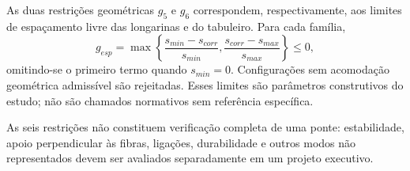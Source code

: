 As duas restrições geométricas $g_5$ e $g_6$ correspondem, respectivamente, aos limites de espaçamento livre das longarinas e do tabuleiro. Para cada família,
\begin{equation}
 g_{esp}=\max\left\{\frac{s_{min}-s_{corr}}{s_{min}},
                         \frac{s_{corr}-s_{max}}{s_{max}}\right\}\leq0,
\label{eq:restricao_espaco}
\end{equation}
omitindo-se o primeiro termo quando $s_{min}=0$. Configurações sem acomodação geométrica admissível são rejeitadas. Esses limites são parâmetros construtivos do estudo; não são chamados normativos sem referência específica.

As seis restrições não constituem verificação completa de uma ponte: estabilidade, apoio perpendicular às fibras, ligações, durabilidade e outros modos não representados devem ser avaliados separadamente em um projeto executivo.
